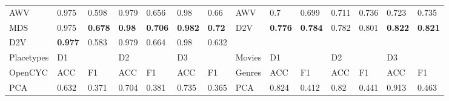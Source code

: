 \begin{landscape}
\begin{table}[]
\begin{tabular}{llllllllllllll}
AWV        & 0.975                           & 0.598                           & 0.979                           & 0.656                           & 0.98                            & 0.66                            & AWV                             & 0.7                             & 0.699                           & 0.711                           & 0.736                           & 0.723                           & 0.735                           \\
MDS        & 0.975                           & \textbf{0.678} & \textbf{0.98}  & \textbf{0.706} & \textbf{0.982} & \textbf{0.72}  & D2V                             & \textbf{0.776} & \textbf{0.784} & 0.782                           & 0.801                           & \textbf{0.822} & \textbf{0.821} \\
D2V        & \textbf{0.977} & 0.583                           & 0.979                           & 0.664                           & 0.98                            & 0.632                           &                                 &                                 &                                 &                                 &                                 &                                 &                                 \\
Placetypes & D1                              &                                 & D2                              &                                 & D3                              &                                 & Movies                          & D1                              &                                 & D2                              &                                 & D3                              &                                 \\
OpenCYC    & ACC                             & F1                              & ACC                             & F1                              & ACC                             & F1                              & Genres                          & ACC                             & F1                              & ACC                             & F1                              & ACC                             & F1                              \\
PCA        & 0.632                           & 0.371                           & 0.704                           & 0.381                           & 0.735                           & 0.365                           & PCA                             & 0.824                           & 0.412                           & 0.82                            & 0.441                           & 0.913                           & 0.463                           \\

\end{tabular}
\end{table}
\end{landscape}
